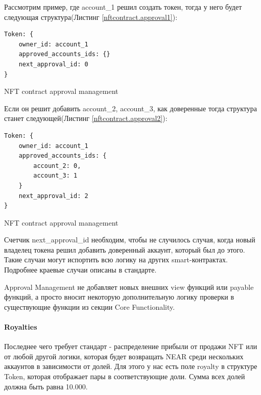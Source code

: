 Рассмотрим пример, где account\_1 решил создать токен, тогда у него будет следующая структура(Листинг {\color{blue}\ref{nftcontract.approval1}}):
\begin{listing}
\begin{verbatim}
Token: {
    owner_id: account_1
    approved_accounts_ids: {}
    next_approval_id: 0
}
\end{verbatim}
\caption{NFT contract approval management}
\label{nftcontract.approval1}
\end{listing}

Если он решит добавить account\_2, account\_3, как доверенные тогда структура станет следующей(Листинг {\color{blue}\ref{nftcontract.approval2}}):
\begin{listing}[H]
\begin{verbatim}
Token: {
    owner_id: account_1
    approved_accounts_ids: {
        account_2: 0,
        account_3: 1
    }
    next_approval_id: 2
}
\end{verbatim}
\caption{NFT contract approval management}
\label{nftcontract.approval2}
\end{listing}

Счетчик next\_approval\_id  необходим, чтобы не случилось случая, когда новый владелец токена решил добавить доверенный аккаунт, который был до этого. Такие случаи могут испортить всю логику на других smart-контрактах.
Подробнее краевые случаи описаны в стандарте\cite{approvalstandard}.

Approval Management не добавляет новых внешних view функций или payable функций, а просто вносит некоторую дополнительную логику проверки в существующие функции из секции Core Functionality.

\paragraph{Royalties}

Последнее чего требует стандарт - распределение прибыли от продажи NFT или от любой другой логики, которая будет возвращать NEAR среди нескольких аккаунтов в зависимости от долей\cite{royaltystandard}.
Для этого у нас есть поле royalty в структуре Token, которая отображает пары в соответствующие доли. Сумма всех долей должна быть равна 10.000.

